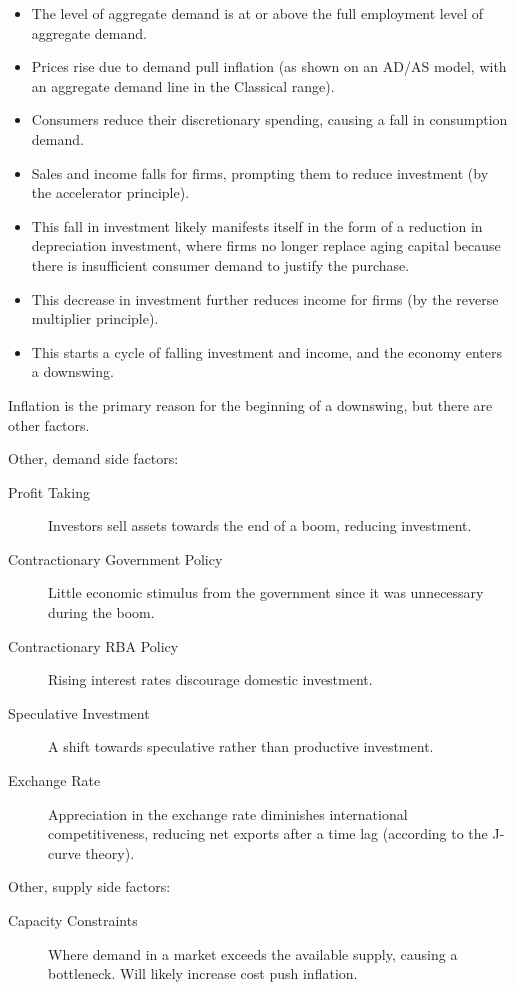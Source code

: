 \documentclass[a4paper,11pt]{article}
\begin{document}
\begin{itemize}
\item The level of aggregate demand is at or above the full employment level of
	aggregate demand.
\item Prices rise due to demand pull inflation (as shown on an AD/AS model, with
	an aggregate demand line in the Classical range).
\item Consumers reduce their discretionary spending, causing a fall in
	consumption demand.
\item Sales and income falls for firms, prompting them to reduce investment (by
	the accelerator principle).
\item This fall in investment likely manifests itself in the form of a reduction
	in depreciation investment, where firms no longer replace aging capital
	because there is insufficient consumer demand to justify the purchase.
\item This decrease in investment further reduces income for firms (by the
	reverse multiplier principle).
\item This starts a cycle of falling investment and income, and the economy
	enters a downswing.
\end{itemize}

Inflation is the primary reason for the beginning of a downswing, but there are
other factors.

Other, demand side factors:

\begin{description}
\item [Profit Taking] Investors sell assets towards the end of a boom, reducing
	investment.
\item [Contractionary Government Policy] Little economic stimulus from the
	government since it was unnecessary during the boom.
\item [Contractionary RBA Policy] Rising interest rates discourage domestic
	investment.
\item [Speculative Investment] A shift towards speculative rather than
	productive investment.
\item [Exchange Rate] Appreciation in the exchange rate diminishes international
	competitiveness, reducing net exports after a time lag (according to the
	J-curve theory).
\end{description}

Other, supply side factors:

\begin{description}
\item [Capacity Constraints] Where demand in a market exceeds the available
	supply, causing a bottleneck. Will likely increase cost push inflation.
\end{description}
\end{document}
